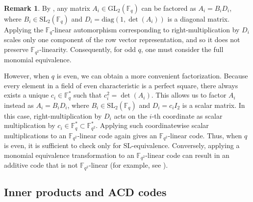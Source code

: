 \documentclass[a4paper,12pt]{article}
\theoremstyle{plain}
\theoremstyle{definition}
\newtheorem{remark}{Remark}
\begin{document}
 

\begin{remark} \label{remarkeven}
By \cite[Lemma 13.3.8]{mullen2013}, any matrix $A_i \in \mathrm{GL}_2(\mathbb{F}_q)$ can   be factored as $A_i = B_i D_i$, where $B_i \in \mathrm{SL}_2(\mathbb{F}_q)$ and $D_i = \mathrm{diag}(1, \det(A_i))$ is a diagonal matrix. Applying the $\mathbb{F}_q$-linear automorphism corresponding to right-multiplication by $D_i$ scales only one component of the row vector representation, and so it does not preserve $\mathbb{F}_{q^2}$-linearity. Consequently, for odd $q$, one must consider the full monomial equivalence.

However, when $q$ is even, we can obtain a more convenient factorization. Because every element in a field of even characteristic is a perfect square, there always exists a unique $c_i \in \mathbb{F}_q^*$ such that $c_i^2 = \det(A_i)$. 
This allows us to factor $A_i$ instead as $A_i = B_i D_i$, where $B_i \in \mathrm{SL}_2(\mathbb{F}_q)$ and $D_i = c_i I_2$ is a scalar matrix. In this case, right-multiplication by $D_i$ acts on the $i$-th coordinate as scalar multiplication by $c_i \in \mathbb{F}_q^* \subset \mathbb{F}_{q^2}^*$. Applying such coordinatewise scalar multiplications to an $\mathbb{F}_{q^2}$-linear code again gives an $\mathbb{F}_{q^2}$-linear code.  Thus, when $q$ is even, it is sufficient to check only for $\mathrm{SL}$-equivalence.
Conversely, applying a monomial equivalence transformation to an $\mathbb{F}_{q^2}$-linear code can result in an additive code that is not $\mathbb{F}_{q^2}$-linear (for example, see \cite[Exercise 558]{huffman2010}).
\end{remark}


\subsection{Inner products and ACD codes}
\end{document}
